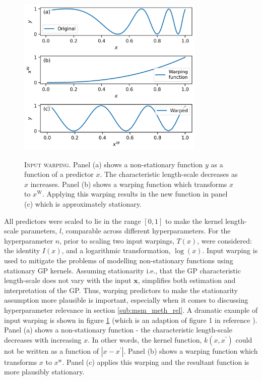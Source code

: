 \begin{figure}
    \centering
    \caption[Input warping]{\textsc{Input warping}. Panel (a) shows a non-stationary function $y$ as a function of a predictor $x$. The characteristic length-scale decreases as $x$ increases. Panel (b) shows a warping function which transforms $x$ to $x^\mathrm{W}$. Applying this warping results in the new function in panel (c) which is approximately stationary.}
    \includegraphics[width=0.8\textwidth]{chapters/msm_optimization/figures/warping_explainer.png}
    \label{fig:msm_warping_explainer}
\end{figure}

All predictors were scaled to lie in the range $[0, 1]$ to make the kernel length-scale parameters, $l$, comparable across different hyperparameters. For the hyperparameter $n$, prior to scaling two input warpings, $T(x)$, were considered: the identity $I(x)$, and a logarithmic transformation, $\log(x)$.  Input warping is used to mitigate the problems of modelling non-stationary functions using stationary GP kernels\cite{snoekInputWarpingBayesian2014a}. Assuming stationarity i.e., that the GP characteristic length-scale  does not vary with the input $\mathbf{x}$, simplifies both estimation and interpretation of the GP\cite{snoekInputWarpingBayesian2014a}. Thus, warping predictors to make the stationarity assumption more plausible is important, especially when it comes to discussing hyperparameter relevance in section \ref{sub:msm_meth_rel}. A dramatic example of input warping is shown in figure \ref{fig:msm_warping_explainer} (which is an adaption of figure 1 in reference \cite{snoekInputWarpingBayesian2014a}). Panel (a) shows a non-stationary function - the characteristic length-scale decreases with increasing $x$. In other words, the kernel function, $k(x, x^{\prime})$ could not be written as a function of $|x-x^{\prime}|$. Panel (b) shows a warping function which transforms $x$ to $x^{\mathrm{w}}$. Panel (c) applies this warping and the resultant function is more plausibly stationary. 

